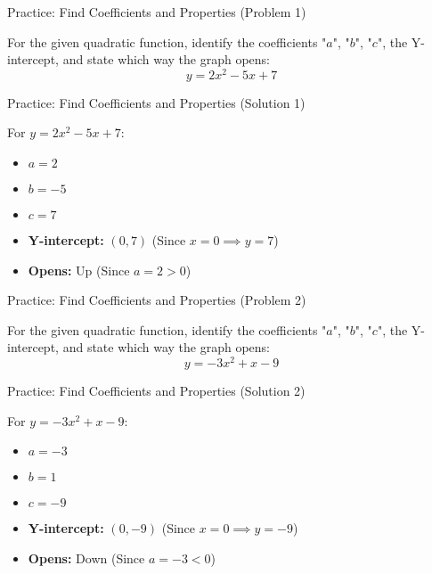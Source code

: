 \documentclass[aspectratio=169]{beamer}
\begin{document}
\begin{frame}{Practice: Find Coefficients and Properties (Problem 1)}
    \begin{tcolorbox}[colback=lightgray,colframe=primary,title=Problem 1]
        \footnotesize
        For the given quadratic function, identify the coefficients "$a$", "$b$", "$c$", the Y-intercept, and state which way the graph opens:\\
        \[ y = 2x^2 - 5x + 7 \]
    \end{tcolorbox}
\end{frame}

\begin{frame}{Practice: Find Coefficients and Properties (Solution 1)}
    \begin{tcolorbox}[colback=lightgray,colframe=accent,title=Solution 1]
        \footnotesize
        For $y = 2x^2 - 5x + 7$:
        \begin{itemize}
            \item $a = 2$
            \item $b = -5$
            \item $c = 7$
            \item \textbf{Y-intercept:} $(0, 7)$ (Since $x=0 \implies y=7$)
            \item \textbf{Opens:} Up (Since $a = 2 > 0$)
        \end{itemize}
    \end{tcolorbox}
\end{frame}

\begin{frame}{Practice: Find Coefficients and Properties (Problem 2)}
    \begin{tcolorbox}[colback=lightgray,colframe=primary,title=Problem 2]
        \footnotesize
        For the given quadratic function, identify the coefficients "$a$", "$b$", "$c$", the Y-intercept, and state which way the graph opens:\\
        \[ y = -3x^2 + x - 9 \]
    \end{tcolorbox}
\end{frame}

\begin{frame}{Practice: Find Coefficients and Properties (Solution 2)}
    \begin{tcolorbox}[colback=lightgray,colframe=accent,title=Solution 2]
        \footnotesize
        For $y = -3x^2 + x - 9$:
        \begin{itemize}
            \item $a = -3$
            \item $b = 1$
            \item $c = -9$
            \item \textbf{Y-intercept:} $(0, -9)$ (Since $x=0 \implies y=-9$)
            \item \textbf{Opens:} Down (Since $a = -3 < 0$)
        \end{itemize}
    \end{tcolorbox}
\end{frame}
\end{document}
